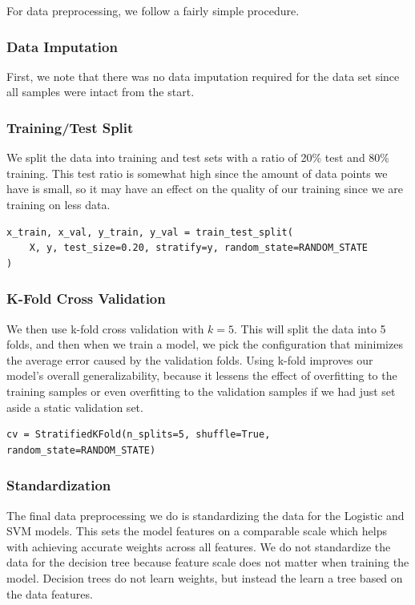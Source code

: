 \documentclass[12pt]{fphw}
\begin{document}
For data preprocessing, we follow a fairly simple procedure. 

\subsubsection*{Data Imputation}
First, we note that there was no data imputation required for the data set since 
all samples were intact from the start. 

\subsubsection*{Training/Test Split}
We split the data into training and test sets with a ratio of 20\% test and 80\% training.
This test ratio is somewhat high since the amount of data points we have is small, so it may have an effect on the quality of our training
since we are training on less data.

\begin{lstlisting}
x_train, x_val, y_train, y_val = train_test_split(
    X, y, test_size=0.20, stratify=y, random_state=RANDOM_STATE
)
\end{lstlisting}

\subsubsection*{K-Fold Cross Validation}
We then use k-fold cross validation with $k=5$. This will split the data into 5 folds, and then when we train a model, we pick the 
configuration that minimizes the average error caused by the validation folds. Using k-fold improves our model's overall generalizability, because it lessens the effect of
overfitting to the training samples or even overfitting to the validation samples if we had just set aside a static validation set.

\begin{lstlisting}
cv = StratifiedKFold(n_splits=5, shuffle=True, random_state=RANDOM_STATE)
\end{lstlisting}

\subsubsection*{Standardization}
The final data preprocessing we do is standardizing the data for the Logistic and SVM models. This sets the model features on a comparable scale
which helps with achieving accurate weights across all features. We do not standardize the data for the decision tree because feature scale does 
not matter when training the model. Decision trees do not learn weights, but instead the learn a tree based on the data features.
\end{document}
